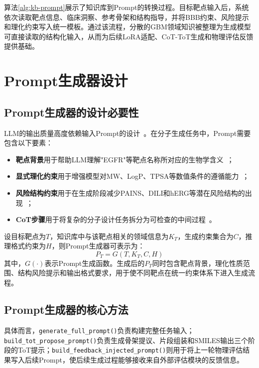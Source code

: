 算法\ref{alg:kb-prompt}展示了知识库到Prompt的转换过程。目标靶点输入后，系统依次读取靶点信息、临床洞察、参考骨架和结构指导，并将BBB约束、风险提示和理化约束写入统一模板。通过该流程，分散的GBM领域知识被整理为生成模型可直接读取的结构化输入，从而为后续LoRA适配、CoT-ToT生成和物理评估反馈提供基础。

\section{Prompt生成器设计}\label{sec:prompt-generator}

\subsection{Prompt生成器的设计必要性}

LLM的输出质量高度依赖输入Prompt的设计~\cite{Wei2022,jin2025effective}。在分子生成任务中，Prompt需要包含以下要素：

\begin{itemize}
    \item \textbf{靶点背景}用于帮助LLM理解"EGFR"等靶点名称所对应的生物学含义~\cite{Fu2025}；
    \item \textbf{显式理化约束}用于增强模型对MW、LogP、TPSA等数值条件的遵循能力~\cite{Pardridge2012}；
    \item \textbf{风险结构约束}用于在生成阶段减少PAINS、DILI和hERG等潜在风险结构的出现~\cite{Aronov2008}；
    \item \textbf{CoT步骤}用于将复杂的分子设计任务拆分为可检查的中间过程~\cite{Wei2022}。
\end{itemize}

设目标靶点为$T$，知识库中与该靶点相关的领域信息为$K_T$，生成约束集合为$C$，推理格式约束为$H$，则Prompt生成器可表示为：
$$P_T = G(T, K_T, C, H)$$
其中，$G(\cdot)$表示Prompt生成函数。生成后的$P_T$同时包含靶点背景，理化性质范围、结构风险提示和输出格式要求，用于使不同靶点在统一约束体系下进入生成流程。

\subsection{Prompt生成器的核心方法}

具体而言，\texttt{generate\_full\_prompt()}负责构建完整任务输入；\texttt{build\_tot\_propose\_prompt()}负责生成骨架提议、片段组装和SMILES输出三个阶段的ToT提示；\texttt{build\_feedback\_injected\_prompt()}则用于将上一轮物理评估结果写入后续Prompt，使后续生成过程能够接收来自外部评估模块的反馈信息。

